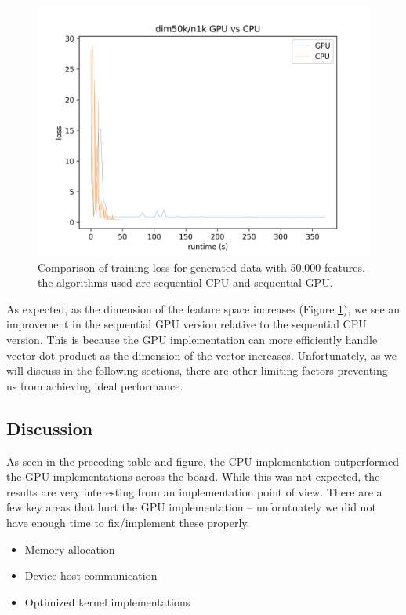 \documentclass{article}
\begin{document}
\begin{figure}
	  \label{fig:50k}
  \centering
  \includegraphics[scale=0.65]{dim50k_CPU_GPU}
  \caption{Comparison of training loss for generated data with 50,000
    features. the algorithms used are sequential CPU and sequential GPU.}
  \end{figure}

As expected, as the dimension of the feature space increases (Figure
\ref{fig:50k}), we see an improvement in the sequential GPU version relative to
the sequential CPU version. This is because the GPU implementation can more
efficiently handle vector dot product as the dimension of the vector
increases. Unfortunately, as we will discuss in the following sections, there
are other limiting factors preventing us from achieving ideal performance.
  
\subsection{Discussion}
As seen in the preceding table and figure, the CPU implementation outperformed
the GPU implementations across the board. While this was not expected, the
results are very interesting from an implementation point of view. There are a
few key areas that hurt the GPU implementation -- unforutnately we did not have
enough time to fix/implement these properly.
\begin{itemize}
    \item Memory allocation
    \item Device-host communication
    \item Optimized kernel implementations
\end{itemize}
\end{document}
